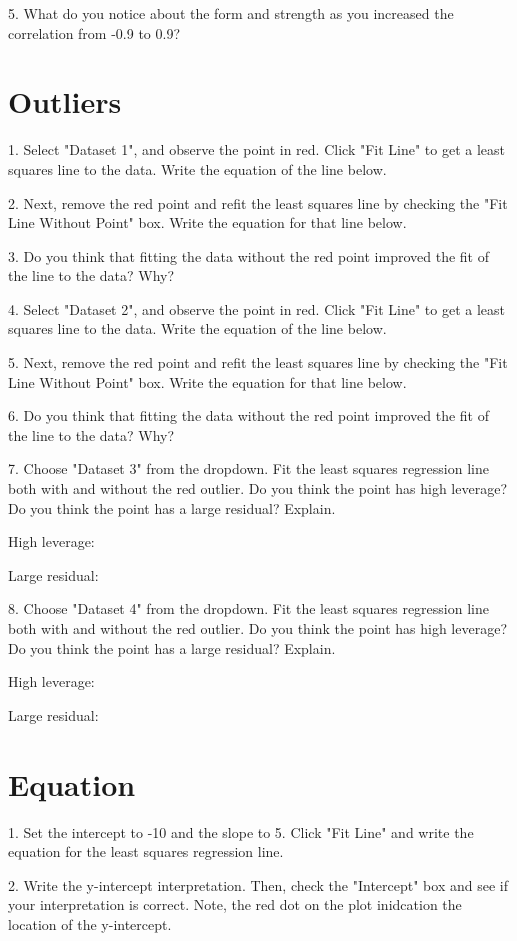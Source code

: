 \documentclass[11pt]{amsart}
\begin{document}
5. What do you notice about the form and strength as you increased the correlation from -0.9 to 0.9?

\section{Outliers}

1. Select "Dataset 1", and observe the point in red. Click "Fit Line" to get a least squares line to the data. Write the equation of the line below.

2. Next, remove the red point and refit the least squares line by checking the "Fit Line Without Point" box.  Write the equation for that line below. 

3. Do you think that fitting the data without the red point improved the fit of the line to the data? Why?

4. Select "Dataset 2", and observe the point in red. Click "Fit Line" to get a least squares line to the data. Write the equation of the line below.

5. Next, remove the red point and refit the least squares line by checking the "Fit Line Without Point" box.  Write the equation for that line below. 

6. Do you think that fitting the data without the red point improved the fit of the line to the data? Why?

7. Choose "Dataset 3" from the dropdown. Fit the least squares regression line both with and without the red outlier. Do you think the point has high leverage? Do you think the point has a large residual? Explain.

High leverage:

Large residual:

8. Choose "Dataset 4" from the dropdown. Fit the least squares regression line both with and without the red outlier. Do you think the point has high leverage? Do you think the point has a large residual? Explain.

High leverage:

Large residual:


\section{Equation}
1.  Set the intercept to -10 and the slope to 5. Click "Fit Line" and write the equation for the least squares regression line.

2. Write the y-intercept interpretation. Then, check the "Intercept" box and see if your interpretation is correct. Note, the red dot on the plot inidcation the location of the y-intercept.
\end{document}

